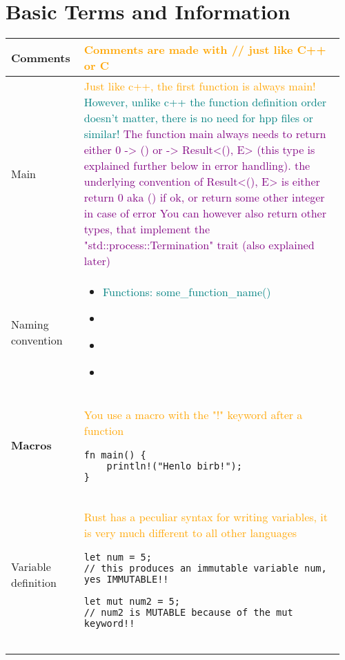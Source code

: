 \documentclass[main.tex,fontsize=8pt,paper=a4,paper=portrait,DIV=calc,]{scrartcl}
\begin{document}
\begin{table}[h!]
\section{Basic Terms and Information}
\begin{tabular}{|m{0.2\linewidth}|m{0.755\linewidth}|}
\hline
Comments & 
\textcolor{orange}{Comments are made with // just like C++ or C}\\
\hline
Main & 
\textcolor{orange}{Just like c++, the first function is always main!}\newline
\textcolor{teal}{However, unlike c++ the function definition order doesn't matter, there is no need for hpp files or similar!}\newline
\textcolor{purple}{The function main always needs to return either 0 -> () or -> Result<(), E> (this type is explained further below in error handling).}\newline
\textcolor{purple}{the underlying convention of Result<(), E> is either return 0 aka () if ok, or return some other integer in case of error\newline
You can however also return other types, that implement the "std::process::Termination" trait (also explained later)}\\
\hline
Naming convention & 
\vspace{2mm}
\begin{itemize}
  \item \textcolor{teal}{Functions: some\_function\_name()}
  \item \textcolor{teal}{}
  \item \textcolor{teal}{}
  \item \textcolor{teal}{}
  \vspace{-3mm}
\end{itemize}\\
\hline
\textbf{Macros} & 
\textcolor{orange}{You use a macro with the "!" keyword after a function}\newline
\begin{lstlisting}
fn main() {
    println!("Henlo birb!");
}
\end{lstlisting}\\
\hline
Variable definition & 
\textcolor{orange}{Rust has a peculiar syntax for writing variables, it is very much different to all other languages}\newline
\begin{lstlisting}
let num = 5; 
// this produces an immutable variable num, yes IMMUTABLE!!

let mut num2 = 5;
// num2 is MUTABLE because of the mut keyword!!


\end{lstlisting}
\end{tabular}
\end{table}
\end{document}
